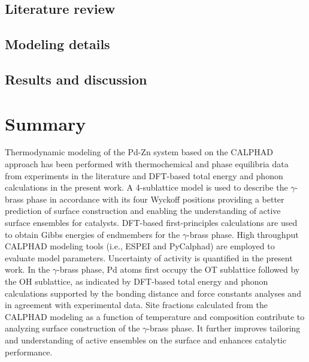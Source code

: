 \subsection{Literature review} \label{intermetallics:ssec:PdZnMlit}


\subsection{Modeling details} \label{intermetallics:ssec:PdZnMmodel}


\subsection{Results and discussion} \label{intermetallics:ssec:PdZnMresult}


\section{Summary} \label{intermetallics:sec:Summary}
Thermodynamic modeling of the Pd-Zn system based on the CALPHAD approach has been performed with thermochemical and phase equilibria data from experiments in the literature and DFT-based total energy and phonon calculations in the present work. A 4-sublattice model is used to describe the $\gamma$-brass phase in accordance with its four Wyckoff positions providing a better prediction of surface construction and enabling the understanding of active surface ensembles for catalysts. DFT-based first-principles calculations are used to obtain Gibbs energies of endmembers for the $\gamma$-brass phase. High throughput CALPHAD modeling tools (i.e., ESPEI and PyCalphad) are employed to evaluate model parameters. Uncertainty of activity is quantified in the present work. In the $\gamma$-brass phase, Pd atoms first occupy the OT sublattice followed by the OH sublattice, as indicated by DFT-based total energy and phonon calculations supported by the bonding distance and force constants analyses and in agreement with experimental data. Site fractions calculated from the CALPHAD modeling as a function of temperature and composition contribute to analyzing surface construction of the $\gamma$-brass phase. It further improves tailoring and understanding of active ensembles on the surface and enhances catalytic performance.


